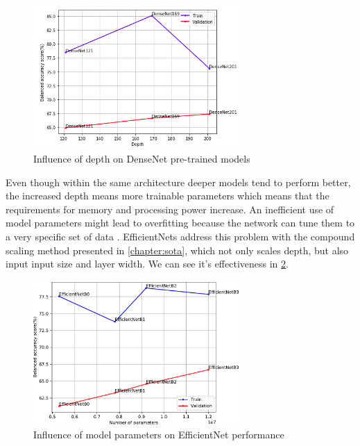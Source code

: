     \begin{figure}[ht]
        \centering
        \includegraphics[width=0.7\textwidth]{figs/densenet_depth.png}
        \caption{Influence of depth on DenseNet pre-trained models}
        \label{fig:densenet_depth}
    \end{figure}
    
    Even though within the same architecture deeper models tend to perform better, the increased depth means more trainable parameters which means that the requirements for memory and processing power increase. An inefficient use of model parameters might lead to overfitting because the network can tune them to a very specific set of data \cite{?}. EfficientNets address this problem with the compound scaling method presented in \autoref{chapter:sota}, which not only scales depth, but also input input size and layer width. We can see it's effectiveness in \ref{fig:efficientnet_params}.
    \begin{figure}[ht]
        \centering
        \includegraphics[width=0.7\textwidth]{figs/efficientnet_params.pdf}
        \caption{Influence of model parameters on EfficientNet performance}
        \label{fig:efficientnet_params}
    \end{figure}
    
